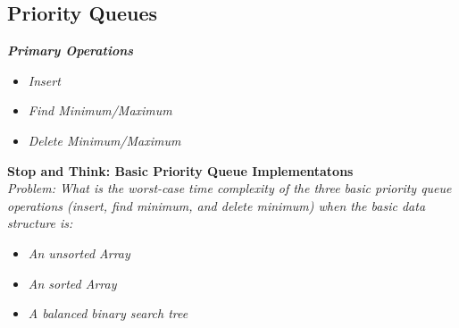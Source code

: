 \subsection{Priority Queues}

\textbf{\emph{Primary Operations}} \\
\begin{itemize}
	\item \emph{Insert}
	\item \emph{Find Minimum/Maximum}
	\item \emph{Delete Minimum/Maximum}
\end{itemize}

\noindent{}

\textbf{Stop and Think: Basic Priority Queue Implementatons} \\

\emph{Problem: What is the worst-case time complexity of the three basic priority queue operations (insert, find minimum, and delete minimum) when the basic data structure is:}\\

\begin{itemize}
	\item \emph{An unsorted Array}
	\item \emph{An sorted Array}
	\item \emph{A balanced binary search tree}
\end{itemize}